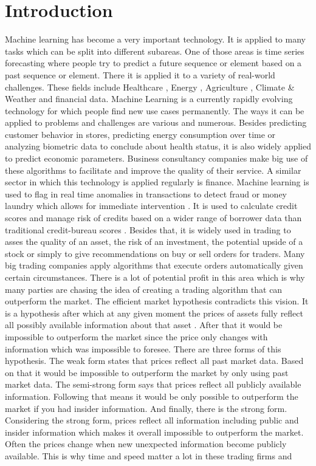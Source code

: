 \documentclass[a4paper,12pt]{report}
\begin{document}
\tableofcontents

\newpage





\chapter{Introduction}
Machine learning has become a very important technology. It is applied to many tasks which can be split into different subareas. One of those areas is time series forecasting where people try to predict a future sequence or element based on a past sequence or element. There it is applied it to a variety of real-world challenges. These fields include Healthcare \cite{1}, Energy \cite{2}, Agriculture \cite{3}, Climate \& Weather \cite{4} and financial data. Machine Learning is a currently rapidly evolving technology for which people find new use cases permanently. The ways it can be applied to problems and challenges are various and numerous. Besides predicting customer behavior in stores, predicting energy consumption over time or analyzing biometric data to conclude about health status, it is also widely applied to predict economic parameters. Business consultancy companies make big use of these algorithms to facilitate and improve the quality of their service. A similar sector in which this technology is applied regularly is finance. Machine learning is used to flag in real time anomalies in transactions to detect fraud or money laundry which allows for immediate intervention \cite{58}. It is used to calculate credit scores and manage risk of credits based on a wider range of borrower data than traditional credit-bureau scores \cite{59}. Besides that, it is widely used in trading to asses the quality of an asset, the risk of an investment, the potential upside of a stock or simply to give recommendations on buy or sell orders for traders. Many big trading companies apply algorithms that execute orders automatically given certain circumstances. There is a lot of potential profit in this area which is why many parties are chasing the idea of creating a trading algorithm that can outperform the market. The efficient market hypothesis contradicts this vision. It is a hypothesis after which at any given moment the prices of assets fully reflect all possibly available information about that asset \cite{60}. After that it would be impossible to outperform the market since the price only changes with information which was impossible to foresee. There are three forms of this hypothesis. The weak form states that prices reflect all past market data. Based on that it would be impossible to outperform the market by only using past market data. The semi-strong form says that prices reflect all publicly available information. Following that means it would be only possible to outperform the market if you had insider information. And finally, there is the strong form. Considering the strong form, prices reflect all information including public and insider information which makes it overall impossible to outperform the market. Often the prices change when new unexpected information become publicly available. This is why time and speed matter a lot in these trading firms and 
\end{document}
